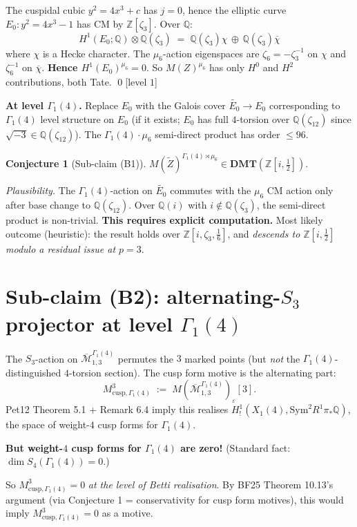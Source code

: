 \documentclass[11pt]{article}
\theoremstyle{definition}
\newtheorem{conjecture}[theorem]{Conjecture}
\newcommand{\MM}{\overline{\mathcal{M}}}
\newcommand{\Z}{\mathbb{Z}}
\newcommand{\Q}{\mathbb{Q}}
\newcommand{\Sym}{\mathrm{Sym}}
\newcommand{\DMT}{\mathbf{DMT}}
\begin{document}
The cuspidal cubic $y^2 = 4x^3+c$ has $j=0$, hence the elliptic curve
$E_0\colon y^2=4x^3-1$ has CM by $\Z[\zeta_3]$. Over $\Q$:
\[
H^1(E_0;\Q) \otimes \Q(\zeta_3) \;=\; \Q(\zeta_3) \chi \,\oplus\, \Q(\zeta_3) \overline{\chi}
\]
where $\chi$ is a Hecke character. The $\mu_6$-action eigenspaces are
$\zeta_6 = -\zeta_3^{-1}$ on $\chi$ and $\zeta_6^{-1}$ on $\overline{\chi}$.
\textbf{Hence $H^1(E_0)^{\mu_6} = 0$}. So $M(Z)^{\mu_6}$ has only $H^0$ and $H^2$
contributions, both Tate. \qed[level $1$]

\textbf{At level $\Gamma_1(4)$.} Replace $E_0$ with the Galois cover
$\widetilde{E_0} \to E_0$ corresponding to $\Gamma_1(4)$ level structure on $E_0$
(if it exists; $E_0$ has full $4$-torsion over $\Q(\zeta_{12})$ since $\sqrt{-3}\in\Q(\zeta_{12})$).
The $\Gamma_1(4)\cdot\mu_6$ semi-direct product has order $\le 96$.

\begin{conjecture}[Sub-claim (B1)]
$M(\widetilde{Z})^{\Gamma_1(4)\rtimes \mu_6} \in \DMT(\Z[i,\tfrac{1}{2}])$.
\end{conjecture}

\noindent\emph{Plausibility.} The $\Gamma_1(4)$-action on $\widetilde{E_0}$ commutes
with the $\mu_6$ CM action only after base change to $\Q(\zeta_{12})$.
Over $\Q(i)$ with $i\not\in \Q(\zeta_3)$, the semi-direct product is non-trivial.
\textbf{This requires explicit computation.} Most likely outcome (heuristic):
the result holds over $\Z[i,\zeta_3,\tfrac{1}{6}]$, and \emph{descends to $\Z[i, \tfrac{1}{2}]$
modulo a residual issue at $p=3$}.

\section{Sub-claim (B2): alternating-$S_3$ projector at level $\Gamma_1(4)$}

The $S_3$-action on $\MM_{1,3}^{\Gamma_1(4)}$ permutes the $3$ marked points
(but \emph{not} the $\Gamma_1(4)$-distinguished $4$-torsion section).
The cusp form motive is the alternating part:
\[
M^3_{\mathrm{cusp}, \Gamma_1(4)} \;:=\; M(\MM_{1,3}^{\Gamma_1(4)})_\varepsilon[3].
\]
Pet12 Theorem 5.1 + Remark 6.4 imply this realises
$H^1_!(X_1(4), \Sym^2 R^1\pi_*\Q)$, the space of weight-$4$ cusp forms for $\Gamma_1(4)$.

\textbf{But weight-$4$ cusp forms for $\Gamma_1(4)$ are zero!}
(Standard fact: $\dim S_4(\Gamma_1(4)) = 0$.)

So $M^3_{\mathrm{cusp}, \Gamma_1(4)} = 0$ \emph{at the level of Betti realisation}.
By BF25 Theorem 10.13's argument (via Conjecture 1 = conservativity for cusp form
motives), this would imply $M^3_{\mathrm{cusp}, \Gamma_1(4)} = 0$ as a motive.
\end{document}
